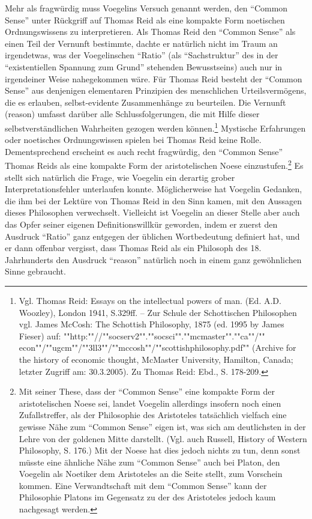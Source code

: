 Mehr als fragwürdig muss Voegelins Versuch genannt werden, den "`Common
Sense"' unter Rückgriff auf Thomas Reid als eine kompakte Form noetischen
Ordnungswissens zu interpretieren. Als Thomas Reid den "`Common Sense"' als
einen Teil der Vernunft bestimmte, dachte er natürlich nicht im Traum an
irgendetwas, was der Voegelinschen "`Ratio"' (als "`Sachstruktur"' des in der
"`existentiellen Spannung zum Grund"' stehenden Bewusstseins) auch nur in
irgendeiner Weise nahegekommen wäre.  Für Thomas Reid besteht der "`Common
Sense"' aus denjenigen elementaren Prinzipien des menschlichen
Urteilsvermögens, die es erlauben, selbst-evidente Zusammenhänge zu
beurteilen.  Die Vernunft (reason) umfasst darüber alle Schlussfolgerungen, die
mit Hilfe dieser selbstverständlichen Wahrheiten gezogen werden
können.\footnote{Vgl.  Thomas Reid: Essays on the intellectual powers of man.
  (Ed. A.D.  Wooz\-ley), London 1941, S.329ff. -- Zur Schule der Schottischen
  Philosophen vgl. James Mc\-Cosh: The Schottish Philosophy, 1875 (ed.  1995
  by James Fieser) auf:
  ""http:""//""socserv2"".""socsci"".""mcmaster"".""ca""/""\~{
  }econ""/""ugcm""/""3ll3""/""mccosh""/""scottishphilosophy.pdf"" (Archive for
  the history of economic thought, McMaster University, Hamilton, Canada;
  letzter Zugriff am: 30.3.2005).  Zu Thomas Reid: Ebd., S. 178-209.}
Mystische Erfahrungen oder noetisches Ordnungswissen spielen bei Thomas Reid
keine Rolle. Dementsprechend erscheint es auch recht fragwürdig, den "`Common
Sense"' Thomas Reids als eine kompakte Form der aristotelischen Noese
einzustufen.\footnote{Mit seiner These, dass der "`Common Sense"' eine
  kompakte Form der aristotelischen Noese sei, landet Voegelin allerdings
  insofern noch einen Zufallstreffer, als der Philosophie des Aristoteles
  tatsächlich vielfach eine gewisse Nähe zum "`Common Sense"' eigen ist, was
  sich am deutlichsten in der Lehre von der goldenen Mitte darstellt.  (Vgl.
  auch Russell, History of Western Philosophy, S. 176.)  Mit der Noese hat dies
  jedoch nichts zu tun, denn sonst müsste eine ähnliche Nähe zum "`Common
  Sense"' auch bei Platon, den Voegelin als Noetiker dem Aristoteles an die
  Seite stellt, zum Vorschein kommen.  Eine Verwandtschaft mit dem "`Common
  Sense"' kann der Philosophie Platons im Gegensatz zu der des Aristoteles
  jedoch kaum nachgesagt werden.}  Es stellt sich natürlich die Frage, wie
Voegelin ein derartig grober Interpretationsfehler unterlaufen konnte.
Möglicherweise hat Voegelin Gedanken, die ihm bei der Lektüre von Thomas Reid
in den Sinn kamen, mit den Aussagen dieses Philosophen verwechselt.  Vielleicht
ist Voegelin an dieser Stelle aber auch das Opfer seiner eigenen
Definitionswillkür geworden, indem er zuerst den Ausdruck "`Ratio"' ganz
entgegen der üblichen Wortbedeutung definiert hat, und er dann offenbar
vergisst, dass Thomas Reid als ein Philosoph des 18. Jahrhunderts den Ausdruck
"`reason"' natürlich noch in einem ganz gewöhnlichen Sinne gebraucht.

